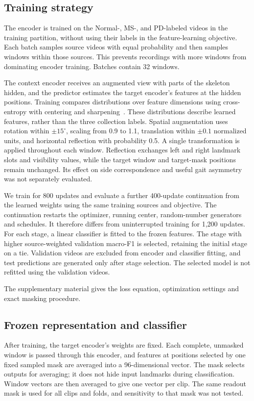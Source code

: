 \documentclass[10pt,twocolumn,letterpaper]{article}
\begin{document}
\subsection{Training strategy}
The encoder is trained on the Normal-, MS-, and PD-labeled videos in the training partition, without using their labels in the feature-learning objective. Each batch samples source videos with equal probability and then samples windows within those sources. This prevents recordings with more windows from dominating encoder training. Batches contain 32 windows.

The context encoder receives an augmented view with parts of the skeleton hidden, and the predictor estimates the target encoder's features at the hidden positions. Training compares distributions over feature dimensions using cross-entropy with centering and sharpening~\cite{dino}. These distributions describe learned features, rather than the three collection labels. Spatial augmentation uses rotation within $\pm15^\circ$, scaling from 0.9 to 1.1, translation within $\pm0.1$ normalized units, and horizontal reflection with probability 0.5. A single transformation is applied throughout each window. Reflection exchanges left and right landmark slots and visibility values, while the target window and target-mask positions remain unchanged. Its effect on side correspondence and useful gait asymmetry was not separately evaluated.

We train for 800 updates and evaluate a further 400-update continuation from the learned weights using the same training sources and objective. The continuation restarts the optimizer, running center, random-number generators and schedules. It therefore differs from uninterrupted training for 1,200 updates. For each stage, a linear classifier is fitted to the frozen features. The stage with higher source-weighted validation macro-F1 is selected, retaining the initial stage on a tie. Validation videos are excluded from encoder and classifier fitting, and test predictions are generated only after stage selection. The selected model is not refitted using the validation videos.


The supplementary material gives the loss equation, optimization settings and exact masking procedure.

\subsection{Frozen representation and classifier}
After training, the target encoder's weights are fixed. Each complete, unmasked window is passed through this encoder, and features at positions selected by one fixed sampled mask are averaged into a 96-dimensional vector. The mask selects outputs for averaging; it does not hide input landmarks during classification. Window vectors are then averaged to give one vector per clip. The same readout mask is used for all clips and folds, and sensitivity to that mask was not tested.
\end{document}
